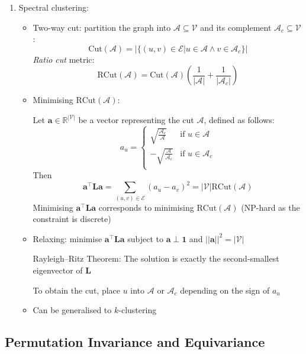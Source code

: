 \documentclass{article}
\begin{document}
\begin{enumerate}
	\item Spectral clustering:
	\begin{itemize}[topsep=0pt]
		\item Two-way cut: partition the graph into $\mathcal{A}\subseteq\mathcal{V}$ and its complement $\mathcal{A}_c\subseteq\mathcal{V}$:
		$$\text{Cut}(\mathcal{A})=\left|\big\{(u, v)\in\mathcal{E}\big|u\in\mathcal{A}\wedge v\in\mathcal{A}_c\big\}\right|$$
		\textit{Ratio cut} metric:
		$$\text{RCut}(\mathcal{A})=\text{Cut}(\mathcal{A})\left(\frac{1}{|\mathcal{A}|}+\frac{1}{|\mathcal{A}_c|}\right)$$
		\item Minimising $\text{RCut}(\mathcal{A})$:
		
		Let $\mathbf{a}\in\mathbb{R}^{|\mathcal{V}|}$ be a vector representing the cut $\mathcal{A}$, defined as follows:
		$$a_u=\begin{cases}
			\sqrt{\frac{\mathcal{A}_c}{\mathcal{A}}} &\text{if }u\in\mathcal{A}\\
			-\sqrt{\frac{\mathcal{A}}{\mathcal{A}_c}} &\text{if }u\in\mathcal{A}_c\\
		\end{cases}$$
		Then
		$$\mathbf{a}^\top\mathbf{L}\mathbf{a}=\sum_{(u,v)\in\mathcal{E}}(a_u-a_v)^2=|\mathcal{V}|\text{RCut}(\mathcal{A})$$
		Minimising $\mathbf{a}^\top\mathbf{L}\mathbf{a}$ corresponds to minimising $\text{RCut}(\mathcal{A})$ (NP-hard as the constraint is discrete)
		\item Relaxing: minimise $\mathbf{a}^\top\mathbf{L}\mathbf{a}$ subject to $\mathbf{a}\perp\mathbf{1}$ and $||\mathbf{a}||^2=|\mathcal{V}|$
		
		Rayleigh--Ritz Theorem: The solution is exactly the second-smallest eigenvector of $\mathbf{L}$
		
		To obtain the cut, place $u$ into $\mathcal{A}$ or $\mathcal{A}_c$ depending on the sign of $a_u$
		\item Can be generalised to $k$-clustering 
	\end{itemize}
\end{enumerate}

\subsection{Permutation Invariance and Equivariance}
\end{document}
